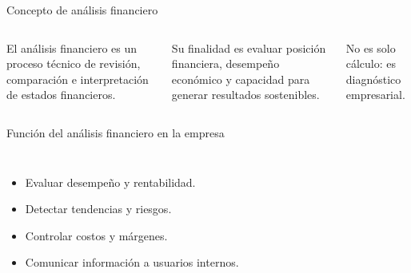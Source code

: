 \begin{frame}{Concepto de análisis financiero}
  \begin{columns}[T,onlytextwidth]
    \footnotesize
    El análisis financiero es un proceso técnico de revisión, comparación e interpretación de estados financieros.

    \vspace{0.4em}
    Su finalidad es evaluar posición financiera, desempeño económico y capacidad para generar resultados sostenibles.

    \vspace{0.4em}
    No es solo cálculo: es diagnóstico empresarial.
  \end{columns}
\end{frame}

\begin{frame}{Función del análisis financiero en la empresa}
  \begin{columns}[T,onlytextwidth]
    \begin{itemize}
      \item Evaluar desempeño y rentabilidad.
      \item Detectar tendencias y riesgos.
      \item Controlar costos y márgenes.
      \item Comunicar información a usuarios internos.
    \end{itemize}
  \end{columns}
\end{frame}


